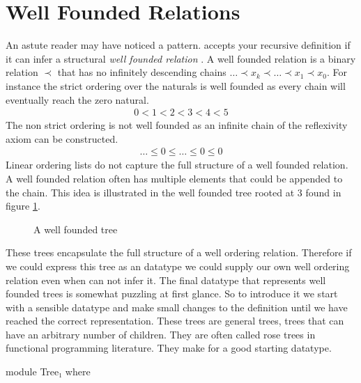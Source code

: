 \documentclass[./Thesis.tex]{subfiles}
\begin{document}
\section{Well Founded Relations}
\label{sec:well-founded-relations}
An astute reader may have noticed a pattern. \Agda{} accepts your recursive
definition if it can infer a structural \textit{well founded relation}
\cite{soare}. A well founded relation is a binary relation $\prec$ that has no
infinitely descending chains $\dots \prec x_k \prec \dots \prec x_1 \prec x_0$.
For instance the strict ordering over the naturals is well founded
as every chain will eventually reach the zero natural.
\begin{align}
  \label{eqn:wellfounded-natural}
  0 < 1 < 2 < 3 < 4 < 5
\end{align}
The non strict ordering is not well founded as an infinite chain of the
reflexivity axiom can be constructed.
\begin{align}
  \label{eqn:non-wellfounded-natural}
  \dots \leq 0 \leq \dots \leq 0 \leq 0
\end{align}
Linear ordering lists do not capture the full structure of a well founded
relation. A well founded relation often has multiple elements that could be
appended to the chain. This idea is illustrated in the well founded tree
rooted at 3 found in figure \ref{fig:wellfounded-tree}.
\begin{figure}[h]
  \centering
  \caption{A well founded tree }
  \label{fig:wellfounded-tree}
\end{figure}
These trees encapsulate the full structure of a well ordering relation.
Therefore if we could express this tree as an \Agda{} datatype we could supply
our own well ordering relation even when \Agda{} can not infer it. The final
datatype that represents well founded trees is somewhat puzzling at first
glance. So to introduce it we start with a sensible datatype and make small
changes to the definition until we have reached the correct representation.
These trees are general trees, trees that can have an arbitrary number
of children. They are often called rose trees in functional programming
literature. They make for a good starting datatype.
\begin{code}[hide]
  module Tree₁ where
\end{code}
\end{document}
